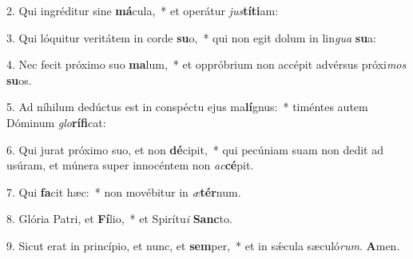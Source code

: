 2. Qui ingréditur sine \textbf{má}cula,~*  et operátur \textit{jus}\textbf{tí}\textbf{ti}am:\

3. Qui lóquitur veritátem in corde \textbf{su}o,~*  qui non egit dolum in lin\textit{gua} \textbf{su}a:\

4. Nec fecit próximo suo \textbf{ma}lum,~*  et oppróbrium non accépit advérsus próxi\textit{mos} \textbf{su}os.\

5. Ad níhilum dedúctus est in conspéctu ejus ma\textbf{lí}gnus:~*  timéntes autem Dóminum \textit{glo}\textbf{rí}\textbf{fi}cat:\

6. Qui jurat próximo suo, et non \textbf{dé}cipit,~*  qui pecúniam suam non dedit ad usúram, et múnera super innocéntem non \textit{ac}\textbf{cé}pit.\

7. Qui \textbf{fa}cit hæc:~*  non movébitur in \textit{æ}\textbf{tér}num.\

8. Glória Patri, et \textbf{Fí}lio,~*  et Spirítu\textit{i} \textbf{Sanc}to.\

9. Sicut erat in princípio, et nunc, et \textbf{sem}per,~*  et in sǽcula sæculó\textit{rum}. \textbf{A}men.\


